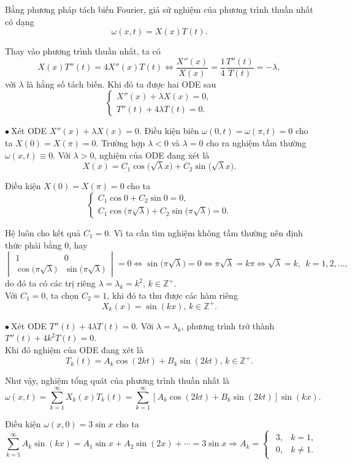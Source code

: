 \documentclass[10pt, a4paper]{article}
\begin{document}
	Bằng phương pháp tách biến Fourier, giả sử nghiệm của phương trình thuần nhất có dạng $$\omega(x,t)=X(x)T(t).$$
	
	Thay vào phương trình thuần nhất, ta có $$X(x)T''(t)=4X''(x)T(t)\iff\frac{X''(x)}{X(x)}=\frac14\frac{T''(t)}{T(t)}=-\lambda,$$
	với $\lambda$ là hằng số tách biến. Khi đó ta được hai ODE sau $$\begin{cases}
		X''(x)+\lambda X(x)=0,\\
		T''(t)+4\lambda T(t)=0.
	\end{cases}$$
	
	$\bullet~$Xét ODE $X''(x)+\lambda X(x)=0$. Điều kiện biên $\omega(0,t)=\omega(\pi,t)=0$ cho ta $X(0)=X(\pi)=0$. Trường hợp $\lambda<0$ và $\lambda=0$ cho ra nghiệm tầm thường $\omega(x,t)\equiv0$. Với $\lambda>0$, nghiệm của ODE đang xét là $$X(x)=C_1\cos\big(\sqrt\lambda x\big)+C_2\sin\big(\sqrt\lambda x\big).$$
	
	Điều kiện $X(0)=X(\pi)=0$ cho ta $$\begin{cases}
		C_1\cos0+C_2\sin0=0,\\
		C_1\cos\big(\pi\sqrt\lambda\big)+C_2\sin\big(\pi\sqrt\lambda\big)=0.
	\end{cases}$$
	
	Hệ luôn cho kết quả $C_1=0$. Vì ta cần tìm nghiệm không tầm thường nên định thức phải bằng 0, hay $$\begin{vmatrix}
		1&0\\
		\cos\big(\pi\sqrt\lambda\big)&\sin\big(\pi\sqrt\lambda\big)
	\end{vmatrix}=0\iff\sin\big(\pi\sqrt\lambda\big)=0\iff\pi\sqrt\lambda=k\pi\iff\sqrt\lambda=k,~~k=1,2,\ldots,$$
	do đó ta có các trị riêng $\lambda=\lambda_k=k^2,\,k\in\mathbb Z^+$.\\
	
	Với $C_1=0$, ta chọn $C_2=1$, khi đó ta thu được các hàm riêng $$X_k(x)=\sin(kx),\,k\in\mathbb Z^+.$$
	
	$\bullet~$Xét ODE $T''(t)+4\lambda T(t)=0$. Với $\lambda=\lambda_k$, phương trình trở thành $T''(t)+4k^2T(t)=0$.\\
	
	Khi đó nghiệm của ODE đang xét là $$T_k(t)=A_k\cos(2kt)+B_k\sin(2kt),\,k\in\mathbb Z^+.$$
	
	Như vậy, nghiệm tổng quát của phương trình thuần nhất là $$\omega(x,t)=\sum_{k=1}^\infty X_k(x)T_k(t)=\sum_{k=1}^\infty[A_k\cos(2kt)+B_k\sin(2kt)]\sin(kx).$$
	
	Điều kiện $\omega(x,0)=3\sin x$ cho ta $$\sum_{k=1}^\infty A_k\sin(kx)=A_1\sin x+A_2\sin(2x)+\cdots=3\sin x\Rightarrow A_k=\begin{cases}
		\begin{array}{ll}
			3, & k=1, \\
			0, & k\ne1.
		\end{array}
	\end{cases}$$
	
\end{document}
